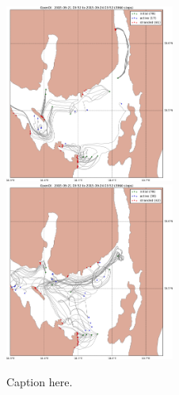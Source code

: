 \documentclass[12pt,a4paper,english]{article}
\begin{document}
\begin{figure}[ht]
\centerline{
\includegraphics*[width=0.495\textwidth]{Opendrift_simulations/LTR3/tokt_drifters_winddrift_0p2_radius_0_num_6_plusminus_2p5h_crop}
\includegraphics*[width=0.495\textwidth]{Opendrift_simulations/LTR3/tokt_drifters_winddrift_0p2_radius_0_num_6_plusminus_2p5h_norkyst_crop}
}
\caption{\small
Caption here.
}
\label{fig:opendriftD2}
\end{figure}
\end{document}
